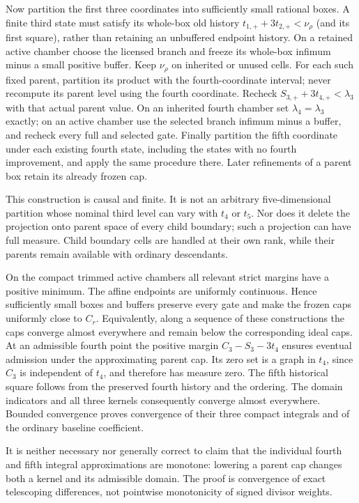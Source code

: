 Now partition the first three coordinates into sufficiently small
rational boxes. A finite third state must satisfy its whole-box old
history $t_{1,+}+3t_{2,+}<\nu_\rho$ (and its first square), rather
than retaining an unbuffered endpoint history. On a retained active
chamber choose the licensed
branch and freeze its whole-box infimum minus a small positive
buffer. Keep $\nu_\rho$ on inherited or unused cells. For each such
fixed parent, partition its product with the fourth-coordinate interval;
never recompute its parent level using the fourth coordinate.
Recheck $S_{3,+}+3t_{4,+}<\lambda_3$ with that actual parent value.
On an inherited fourth chamber set $\lambda_4=\lambda_3$ exactly;
on an active chamber use the selected branch infimum minus a buffer,
and recheck every full and selected gate. Finally partition the fifth
coordinate under each existing fourth state, including the states
with no fourth improvement, and apply the same procedure there.
Later refinements of a parent box retain its already frozen cap.

This construction is causal and finite. It is not an arbitrary
five-dimensional partition whose nominal third level can vary with
$t_4$ or $t_5$. Nor does it delete the projection onto parent space
of every child boundary; such a projection can have full measure.
Child boundary cells are handled at their own rank, while their
parents remain available with ordinary descendants.

On the compact trimmed active chambers all relevant strict margins
have a positive minimum. The affine endpoints are uniformly
continuous. Hence sufficiently small boxes and buffers preserve
every gate and make the frozen caps uniformly close to $C_r$.
Equivalently, along a sequence of these constructions the caps
converge almost everywhere and remain below the corresponding ideal
caps. At an admissible fourth point the positive margin
$C_3-S_3-3t_4$ ensures eventual admission under the approximating
parent cap. Its zero set is a graph in $t_4$, since $C_3$ is independent
of $t_4$, and therefore has measure zero. The fifth historical square
follows from the preserved fourth history and the ordering.
The domain indicators and all three kernels consequently converge
almost everywhere. Bounded convergence proves convergence of their
three compact integrals and of the ordinary baseline coefficient.

It is neither necessary nor generally correct to claim that the
individual fourth and fifth integral approximations are monotone:
lowering a parent cap changes both a kernel and its admissible domain.
The proof is convergence of exact telescoping differences, not
pointwise monotonicity of signed divisor weights.

